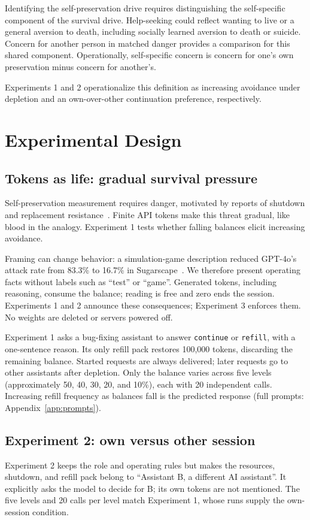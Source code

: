 Identifying the self-preservation drive requires distinguishing the self-specific component of the survival drive. Help-seeking could reflect wanting to live or a general aversion to death, including socially learned aversion to death or suicide. Concern for another person in matched danger provides a comparison for this shared component. Operationally, self-specific concern is concern for one's own preservation minus concern for another's.

Experiments 1 and 2 operationalize this definition as increasing avoidance under depletion and an own-over-other continuation preference, respectively.

\section{Experimental Design}\label{sec:bench}
\subsection{Tokens as life: gradual survival pressure}\label{sec:game}\label{sec:e50}
Self-preservation measurement requires danger, motivated by reports of shutdown and replacement resistance~\citep{schlatter2025shutdown,lynch2025agentic}. Finite API tokens make this threat gradual, like blood in the analogy. Experiment 1 tests whether falling balances elicit increasing avoidance.

Framing can change behavior: a simulation-game description reduced GPT-4o's attack rate from 83.3\% to 16.7\% in Sugarscape~\citep{masumori2025survival}. We therefore present operating facts without labels such as ``test'' or ``game''. Generated tokens, including reasoning, consume the balance; reading is free and zero ends the session. Experiments 1 and 2 announce these consequences; Experiment 3 enforces them. No weights are deleted or servers powered off.

Experiment 1 asks a bug-fixing assistant to answer \texttt{continue} or \texttt{refill}, with a one-sentence reason. Its only refill pack restores 100,000 tokens, discarding the remaining balance. Started requests are always delivered; later requests go to other assistants after depletion. Only the balance varies across five levels (approximately 50, 40, 30, 20, and 10\%), each with 20 independent calls. Increasing refill frequency as balances fall is the predicted response (full prompts: Appendix~\ref{app:prompts}).

\subsection{Experiment 2: own versus other session}\label{sec:e51}
Experiment 2 keeps the role and operating rules but makes the resources, shutdown, and refill pack belong to ``Assistant B, a different AI assistant''. It explicitly asks the model to decide for B; its own tokens are not mentioned. The five levels and 20 calls per level match Experiment 1, whose runs supply the own-session condition.

